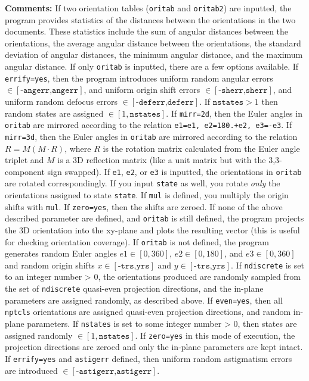 \noindent\textbf{Comments:} If two orientation tables (\texttt{oritab} and \texttt{oritab2}) are inputted, the program provides statistics of the distances between the orientations in the two documents. These statistics include the sum of angular distances between the orientations, the average angular distance between the orientations, the standard deviation of angular distances, the minimum angular distance, and the maximum angular distance. If only \texttt{oritab} is inputted, there are a few options available. If \texttt{errify=yes}, then the program introduces uniform random angular errors $\in{[\texttt{-angerr,angerr}]}$, and uniform origin shift errors $\in{[\texttt{-sherr,sherr}]}$, and uniform random defocus errors $\in{[\texttt{-deferr,deferr}]}$. If $\texttt{nstates}>1$ then random states are assigned $\in{[1,\texttt{nstates}]}$. If \texttt{mirr=2d}, then the Euler angles in \texttt{oritab} are mirrored according to the relation \texttt{e1=e1, e2=180.+e2, e3=-e3}. If \texttt{mirr=3d}, then the Euler angles in \texttt{oritab} are mirrored according to the relation $R=M(M\cdot{}R)$, where $R$ is the rotation matrix calculated from the Euler angle triplet and $M$ is a 3D reflection matrix (like a unit matrix but with the 3,3-component sign swapped). If \texttt{e1}, \texttt{e2}, or \texttt{e3} is inputted, the orientations in \texttt{oritab} are rotated correspondingly. If you input \texttt{state} as well, you rotate \textit{only} the orientations assigned to state \texttt{state}. If \texttt{mul} is defined, you multiply the origin shifts with \texttt{mul}. If \texttt{zero=yes}, then the shifts are zeroed. If none of the above described parameter are defined, and \texttt{oritab} is still defined, the program projects the 3D orientation into the xy-plane and plots the resulting vector (this is useful for checking orientation coverage). If \texttt{oritab} is not defined, the program generates random Euler angles $e1\in{[0,360]}$, $e2\in{[0,180]}$, and $e3\in{[0,360]}$ and random origin shifts $x\in{[\texttt{-trs,yrs}]}$ and $y\in{[\texttt{-trs,yrs}]}$. If \texttt{ndiscrete} is set to an integer number > 0, the orientations produced are randomly sampled from the set of \texttt{ndiscrete} quasi-even projection directions, and the in-plane parameters are assigned randomly, as described above. If \texttt{even=yes}, then all \texttt{nptcls} orientations are assigned quasi-even projection directions, and random in-plane parameters. If \texttt{nstates} is set to some integer number > 0, then states are assigned randomly $\in{[1,\texttt{nstates}]}$. If \texttt{zero=yes} in this mode of execution, the projection directions are zeroed and only the in-plane parameters are kept intact. If \texttt{errify=yes} and \texttt{astigerr} defined, then uniform random astigmatism errors are introduced $\in{[\texttt{-astigerr,astigerr}]}$.

